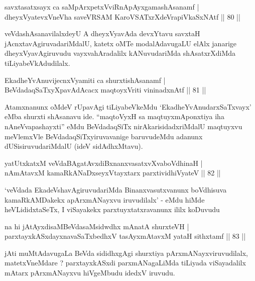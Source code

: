 \begin{shl}
savxtasatxsayx ca saMpArxpetxVviRnA\s pAyxgamashAsanamf  | \\
dheyxVyatevxVneVha saveVRSAM KaroVSATxrXdeVrapiVkaSxNAtf \hfill||  80 ||  
\end{shl}

\begin{artha}
veVdashAsanavilalxdeyU A dheyxVyavAda devxYtavu savxtaH jAcnxtavAgiruvadariMdalU, katetx oMTe modalAdavugaLU elAlx janarige dheyxVyavAgiruvudu vayxvahAradalilx kANuvudariMda shAsatxrXdiMda tiLiyabeVkAdudilalx.
\end{artha}

\begin{shl}
EkadheYvAnuvijecnxVyamiti ca shurxtishAsanamf  | \\
BeVdadaqSaTxyXpavAdAcacx maqtoyxVriti vininadxnAtf \hfill||  81 ||  
\end{shl}

\begin{artha}
Atamxnanunx oMdeV rUpavAgi tiLiyabeVkeMdu `EkadheYvAnudarxSaTxvayx' eMba shurxti shAsanavu ide. ``maqtoVyxH sa maqtuyxmAponxtiya iha nAneVvapashayxti'' eMdu BeVdadaqSiTx nirAkarisidadxriMdalU maqtuyxvu meVlemxVle BeVdadaqSiTxyiruvavanige baruvudeMdu adanunx dUSisiruvudariMdalU (ideV sidAdhxMtavu).
\end{artha}


\begin{shl}
yatUtxkatxM veVdaBAgatAvxdiBxnanxvasatxvXvaboVdhinaH  | \\
nAmAtavxM kamaRkANaDxseyxVtayxtarx parxtividhiVyateV \hfill||  82 ||  
\end{shl}

\begin{artha}
`veVdada EkadeVshavAgiruvudariMda Binanxvasutxvanunx boVdhisuva kamaRkAMDakekx apArxmANayxvu iruvudilalx' - eMdu hiMde heVLididxtaSeTx, I viSayakekx parxtuyxtatxravanunx ililx koDuvudu \mdash 
\end{artha}

\begin{shl}
na hi jAtAyxdisaMBeVdasaMsidwdhx mAnatA shurxteVH  | \\
parxtayxkASxdayxnavaSaTxbedhxV tasAyxmAtavxM yataH sithxtamf \hfill||  83 ||  
\end{shl}

\begin{artha}
jAti muMtAdavugaLa BeVda sididhxgAgi shurxtiya pArxmANayxviruvudilalx, matetxVneMdare ? parxtayxkASxdi parxmANagaLiMda tiLiyada viSayadalilx mAtarx pArxmANayxvu hiVgeMbudu idedxV iruvudu.
\end{artha}

